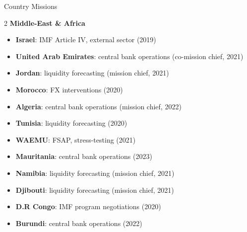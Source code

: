 \documentclass[usegeometry, 10pt, a4paper]{cv} %
\begin{document}
\begin{rubriquetableau}[0.95\textwidth]{Country Missions}
\begin{multicols}{2}
  \textbf{\large Middle-East \&  Africa}
\begin{itemize}
  \item \textbf{Israel}: IMF Article IV, external sector (2019)
  \item \textbf{United Arab Emirates}: central bank operations (co-mission chief, 2021)
  \item \textbf{Jordan}: liquidity forecasting (mission chief, 2021)
  \item \textbf{Morocco}: FX interventions (2020)  
  \item \textbf{Algeria}: central bank operations (mission chief, 2022)
  \item \textbf{Tunisia}: liquidity forecasting (2020)
  \item \textbf{WAEMU}: FSAP, stress-testing (2021)
  \item \textbf{Mauritania}: central bank operations (2023)
  \item \textbf{Namibia}: liquidity forecasting (mission chief, 2021)
  \item \textbf{Djibouti}: liquidity forecasting (mission chief, 2021)
  \item \textbf{D.R Congo}: IMF program negotiations (2020)
  \item \textbf{Burundi}: central bank operations (2022)
\end{itemize}
\end{multicols}  
\end{rubriquetableau}
\end{document}
